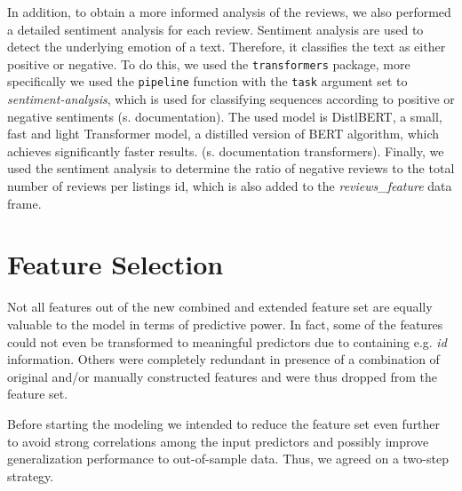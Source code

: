 \documentclass[12pt, letterpaper]{article}
\begin{document}
In addition, to obtain a more informed analysis of the reviews, we also performed a detailed sentiment analysis for each review. Sentiment analysis are used to detect the underlying emotion of a text. Therefore, it classifies the text as either positive or negative.
To do this, we used the \texttt{transformers} package, more specifically we used the \texttt{pipeline} function
with the \texttt{task} argument set to \textit{sentiment-analysis}, which is used for classifying sequences
according to positive or negative sentiments (s. documentation). The used model is DistlBERT,
a small, fast and light Transformer model, a distilled version of BERT algorithm, which achieves significantly faster results. (s. documentation transformers).
Finally, we used the sentiment analysis to determine the ratio of negative reviews to the total number of reviews per listings id, which is also added to the \textit{reviews\_feature} data frame.



\section{Feature Selection}

Not all features out of the new combined and extended feature set are equally valuable to the model in terms of predictive power.
In fact, some of the features could not even be transformed to meaningful predictors due to containing e.g. \emph{id} information.
Others were completely redundant in presence of a combination of original and/or manually constructed features and were thus dropped from the feature set.

Before starting the modeling we intended to reduce the feature set even further to avoid strong correlations among the input predictors and possibly improve generalization performance to out-of-sample data.
Thus, we agreed on a two-step strategy.
\end{document}
